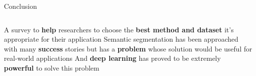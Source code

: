 \begin{frame}[t]{Conclusion} 
    \begin{columns}[c]
            \newline
            \newline
                A survey to \textbf{help} researchers to choose the \textbf{best method and dataset} it's appropriate for their application
            \newline
            \newline
                Semantic segmentation has been approached with many \textbf{success} stories but has a \textbf{problem} whose solution would be useful for real-world applications
            \newline
            \newline
                And \textbf{deep learning} has proved to be extremely \textbf{powerful} to solve this problem
           
        
    \end{columns}
    
\end{frame}

           
        
    
